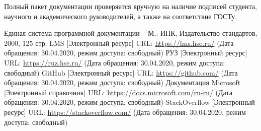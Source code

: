 \documentclass{../includes/TechDoc}
\begin{document}
    Полный пакет документации проверяется вручную на наличие подписей студента, научного и академического руководителей, а также на соответствие ГОСТу.



    \begin{thebibliography}{3}
        Единая система программной документации – М.: ИПК, Издательство стандартов, 2000, 125 стр.
         LMS [Электронный ресурс] URL: \url{https://lms.hse.ru/} (Дата обращения: 30.04.2020, режим доступа: свободный)
         РУЗ [Электронный ресурс] URL: \url{https://ruz.hse.ru/} (Дата обращения: 30.04.2020, режим доступа: свободный)
         GitHub [Электронный ресурс] URL: \url{https://github.com/} (Дата обращения: 30.04.2020, режим доступа: свободный)
         Документация Microsoft [Электронный справочник] URL: \url{https://docs.microsoft.com/ru-ru/} (Дата обращения: 30.04.2020, режим доступа: свободный)
         StackOverflow [Электронный ресурс] URL: \url{https://stackoverflow.com/} (Дата обращения: 30.04.2020, режим доступа: свободный)
    \end{thebibliography}

    \registrationList
\end{document}
